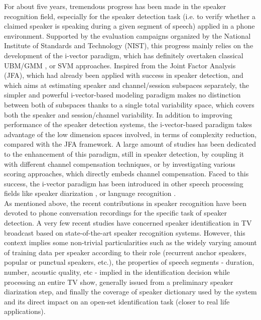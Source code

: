 For about five years, tremendous progress has been made in the speaker recognition field, especially for the speaker detection task (i.e. to verify whether a claimed
speaker is speaking during a given segment of speech) applied in a phone environment. Supported by the evaluation campaigns organized by the National Institute of Standards and Technology (NIST)\cite{greenberg2013,greenberg2014}, this progress mainly relies on the development of the i-vector paradigm, which has definitely overtaken classical UBM/GMM \cite{bimbot2004}, or SVM \cite{wan2000} approaches. Inspired from the Joint Factor Analysis (JFA), which had already been applied with success in speaker detection, and which aims at estimating speaker and channel/session subspaces separately, the simpler and powerful i-vector-based modeling paradigm \cite{dehak2011} makes no distinction between both of subspaces thanks to a single total variability space, which covers both the speaker and session/channel variability. In addition to improving performance of the speaker detection systems, the i-vector-based paradigm takes advantage of the low dimension spaces involved, in terms of complexity reduction, compared with the JFA framework. A large amount of studies has been dedicated to the enhancement of this paradigm, still in speaker detection, by coupling it with different channel compensation techniques\cite{dehak2011,bousquet2012,kanagasundaram2014}, or by investigating various scoring approaches, which directly embeds channel compensation\cite{kenny2010,dehak2011,garcia2011,jiang2012,bousquet2014}. Faced to this success, the i-vector paradigm has been introduced in other speech processing fields like speaker diarization \cite{dupuy2012,shum2013,senoussaoui2014}, or language recognition \cite{martinez2011,dehak2011b}. \\

As mentioned above, the recent contributions in speaker recognition have been devoted to phone conversation recordings for the specific task of speaker detection.  A very few recent studies have concerned speaker identification in TV broadcast based on state-of-the-art speaker recognition systems. However, this context implies some non-trivial particularities such as the widely varying amount of training data per speaker according to their role (recurrent anchor speakers, popular or punctual speakers, etc.), the properties of speech segments - duration, number, acoustic quality, etc - implied in the identification decision while processing an entire TV show, generally issued from a preliminary speaker diarization step, and finally the coverage of speaker dictionary used by the system and its direct impact on an open-set identification task (closer to real life applications).








